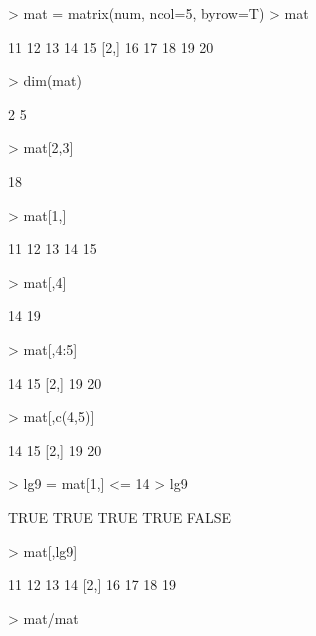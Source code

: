 \documentclass[12pt]{article}
\begin{document}
\begin{Schunk}
\begin{Sinput}
> mat = matrix(num, ncol=5, byrow=T)
> mat
\end{Sinput}
\begin{Soutput}
     [,1] [,2] [,3] [,4] [,5]
[1,]   11   12   13   14   15
[2,]   16   17   18   19   20
\end{Soutput}
\begin{Sinput}
> dim(mat)
\end{Sinput}
\begin{Soutput}
[1] 2 5
\end{Soutput}
\begin{Sinput}
> mat[2,3]
\end{Sinput}
\begin{Soutput}
[1] 18
\end{Soutput}
\begin{Sinput}
> mat[1,]
\end{Sinput}
\begin{Soutput}
[1] 11 12 13 14 15
\end{Soutput}
\begin{Sinput}
> mat[,4]
\end{Sinput}
\begin{Soutput}
[1] 14 19
\end{Soutput}
\begin{Sinput}
> mat[,4:5]
\end{Sinput}
\begin{Soutput}
     [,1] [,2]
[1,]   14   15
[2,]   19   20
\end{Soutput}
\begin{Sinput}
> mat[,c(4,5)]
\end{Sinput}
\begin{Soutput}
     [,1] [,2]
[1,]   14   15
[2,]   19   20
\end{Soutput}
\begin{Sinput}
> lg9 = mat[1,] <= 14
> lg9
\end{Sinput}
\begin{Soutput}
[1]  TRUE  TRUE  TRUE  TRUE FALSE
\end{Soutput}
\begin{Sinput}
> mat[,lg9]
\end{Sinput}
\begin{Soutput}
     [,1] [,2] [,3] [,4]
[1,]   11   12   13   14
[2,]   16   17   18   19
\end{Soutput}
\begin{Sinput}
> mat/mat
\end{Sinput}

\end{Schunk}
\end{document}
